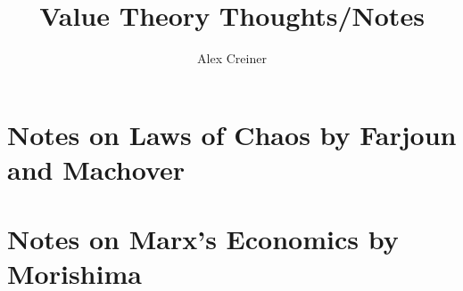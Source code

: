 \documentclass{article}
\title{Value Theory Thoughts/Notes}
\author{Alex Creiner}
\date{}
\theoremstyle{definition}
\theoremstyle{plain}
\theoremstyle{theorem}
\begin{document}
\maketitle
\tableofcontents
\newpage

\part{Notes on Laws of Chaos by Farjoun and Machover}




\part{Notes on Marx's Economics by Morishima}



\end{document}
